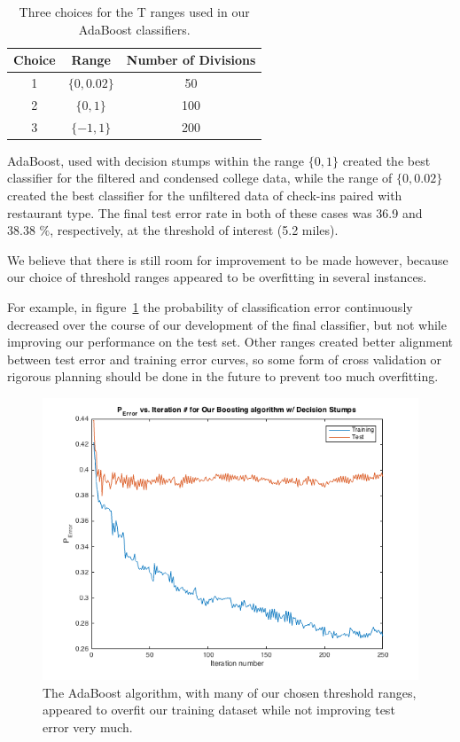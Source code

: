 \documentclass[10pt,twocolumn,letterpaper]{article}
\begin{document}
\begin{table}[ht]
  \centering{}
  \begin{tabular}{|c|c|c|}
    \hline
    Choice & Range          & Number of Divisions\tabularnewline
    \hline
    \hline
    1      & $\{ 0, 0.02 \} $ & 50\tabularnewline
    \hline
    2      & $\{ 0, 1 \} $    & 100\tabularnewline
    \hline
    3      & $\{ -1, 1 \} $  & 200\tabularnewline
    \hline
  \end{tabular}
  \caption{Three choices for the T ranges used in our AdaBoost classifiers.}\label{table:ada_t_ranges}
\end{table}

AdaBoost, used with decision stumps within the range $ \{ 0, 1 \} $ created the
best classifier for the filtered and condensed college data, while the range of
$ \{ 0 , 0.02 \} $ created the best classifier for the unfiltered data of
check-ins paired with restaurant type. The final test error rate in both of
these cases was 36.9 and 38.38 $ \% $, respectively, at the threshold of
interest (5.2 miles).

We believe that there is still room for improvement to be made however, because
our choice of threshold ranges appeared to be overfitting in several instances.

For example, in figure~\ref{fig:adaboost_250i_example} the probability of
classification error continuously decreased over the course of our development
of the final classifier, but not while improving our performance on the test
set. Other ranges created better alignment between test error and training error
curves, so some form of cross validation or rigorous planning should be done in
the future to prevent too much overfitting.

\begin{figure}
  \centering
  \includegraphics[width=0.9\linewidth]{adaboost_decision_stumps_0_1_250iter_filtered2}
  \caption{The AdaBoost algorithm, with many of our chosen threshold ranges, appeared to overfit our training dataset while not improving test error very much.}
\label{fig:adaboost_250i_example}
\end{figure}
\end{document}

